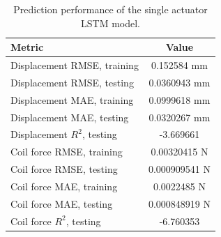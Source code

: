 \begin{table}[H]
\centering
\caption{Prediction performance of the single actuator LSTM model.}
\label{tab:lstm_prediction_metrics_python}
\begin{tabular}{l c}
\hline
Metric & Value \\
\hline
Displacement RMSE, training & 0.152584 mm \\
Displacement RMSE, testing & 0.0360943 mm \\
Displacement MAE, training & 0.0999618 mm \\
Displacement MAE, testing & 0.0320267 mm \\
Displacement $R^2$, testing & -3.669661 \\
Coil force RMSE, training & 0.00320415 N \\
Coil force RMSE, testing & 0.000909541 N \\
Coil force MAE, training & 0.0022485 N \\
Coil force MAE, testing & 0.000848919 N \\
Coil force $R^2$, testing & -6.760353 \\
\hline
\end{tabular}
\end{table}
